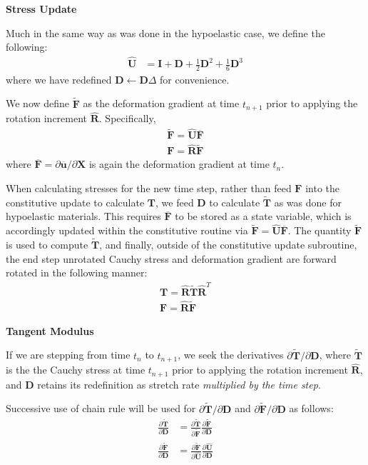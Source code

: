 \textbf{Stress Update}

Much in the same way as was done in the hypoelastic case, we define the following:
\begin{align}
\hat{\bm {U}} &= {\bm I} + {\bm D} + \frac{1}{2}{\bm D}^2 + \frac{1}{6}{\bm D}^3
\end{align}
where we have redefined ${\bm D}\leftarrow{\bm D}\Delta$ for convenience.

We now define $\tilde {\bm F}$ as the deformation gradient at time $t_{n+1}$ prior to applying the rotation increment $\hat{\bm R}$. Specifically,
\begin{align}
\tilde {\bm F} = \hat{\bm U}\overline{\bm F} \\
{\bm F} = \hat{\bm R}\tilde {\bm F}
\end{align}
where $\overline{\bm F} = \partial {\overline{{\bm u}}}/\partial {\bm X}$ is again the deformation gradient at time $t_n$.

When calculating stresses for the new time step, rather than feed ${\bm F}$ into the constitutive update to calculate ${\bm T}$, we feed $\bm{D}$ to calculate $\tilde{\bm{T}}$ as was done for hypoelastic materials. This requires $\overline {\bm F}$ to be stored as a state variable, which is accordingly updated within the constitutive routine via $\tilde {\bm F} = \hat{\bm U}\overline{\bm F} $. The quantity $\tilde{\bm{F}}$ is used to compute $\tilde{\bm T}$, and finally, outside of the constitutive update subroutine, the end step unrotated Cauchy stress and deformation gradient are forward rotated in the following manner:
\begin{gather}
{\bm T} = \hat{\bm R}\tilde{\bm T}\hat{\bm R}^T \\
\bm{F} = \hat{\bm{R}}\tilde{\bm{F}}
\end{gather}

\textbf{Tangent Modulus}

If we are stepping from time $t_n$ to $t_{n+1}$, we seek the derivatives $\partial{\tilde{\bm T}}/\partial {\bm D}$, where $\tilde{\bm T}$ is the the Cauchy stress at time $t_{n+1}$ prior to applying the rotation increment $\hat{\bm R}$, and ${\bm D}$ retains its redefinition as stretch rate \textit{multiplied by the time step}.

Successive use of chain rule will be used for $\partial \tilde{\bm{T}}/\partial{\bm{D}}$ and $\partial \tilde {\bm F}/\partial {\bm D}$ as follows:
\begin{align}
\frac{\partial \tilde{\bm T}}{\partial \bm D} &= \frac{\partial \tilde{\bm T}}{\partial \tilde{\bm F}}\frac{\partial \tilde{\bm F}}{\partial {\bm D}}
\label{eq:tanmod} \\
\frac{\partial \tilde{\bm F}}{\partial {\bm D}} &= \frac{\partial \tilde{\bm F}}{\partial {\hat {\bm U}}}\frac{\partial \hat{\bm U}}{\partial {\bm D}} 
\end{align}

